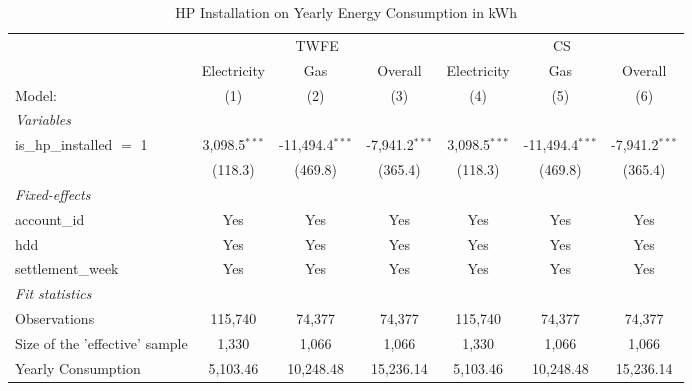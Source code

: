 
\begin{table}[htbp]
   \centering
   \begin{threeparttable}[b]
      \caption{\label{tab:hp-did-overall-conso-detailed} HP Installation on Yearly Energy Consumption in kWh}
      \begin{tabular}{lcccccc}
         \tabularnewline \midrule \midrule
          & \multicolumn{3}{c}{TWFE} & \multicolumn{3}{c}{CS} \\ 
                                        & Electricity     & Gas               & Overall          & Electricity     & Gas               & Overall \\   
         Model:                         & (1)             & (2)               & (3)              & (4)             & (5)               & (6)\\  
         \midrule
         \emph{Variables}\\
         is\_hp\_installed $=$ 1        & 3,098.5$^{***}$ & -11,494.4$^{***}$ & -7,941.2$^{***}$ & 3,098.5$^{***}$ & -11,494.4$^{***}$ & -7,941.2$^{***}$\\   
                                        & (118.3)         & (469.8)           & (365.4)          & (118.3)         & (469.8)           & (365.4)\\   
         \midrule
         \emph{Fixed-effects}\\
         account\_id                    & Yes             & Yes               & Yes              & Yes             & Yes               & Yes\\  
         hdd                            & Yes             & Yes               & Yes              & Yes             & Yes               & Yes\\  
         settlement\_week               & Yes             & Yes               & Yes              & Yes             & Yes               & Yes\\  
         \midrule
         \emph{Fit statistics}\\
         Observations                   & 115,740         & 74,377            & 74,377           & 115,740         & 74,377            & 74,377\\  
         Size of the 'effective' sample & 1,330           & 1,066             & 1,066            & 1,330           & 1,066             & 1,066\\  
         Yearly Consumption             & 5,103.46        & 10,248.48         & 15,236.14        & 5,103.46        & 10,248.48         & 15,236.14\\  

\end{tabular}
\end{threeparttable}
\end{table}

